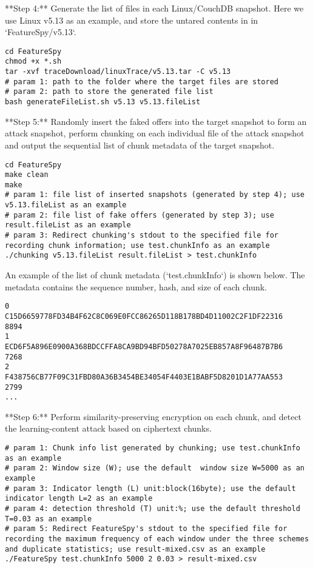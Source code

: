 **Step 4:** Generate the list of files in each Linux/CouchDB snapshot. Here we use Linux v5.13 as an example, and store the untared contents in in `FeatureSpy/v5.13`.

\begin{lstlisting}[style=shell]
cd FeatureSpy
chmod +x *.sh
tar -xvf traceDownload/linuxTrace/v5.13.tar -C v5.13
# param 1: path to the folder where the target files are stored
# param 2: path to store the generated file list
bash generateFileList.sh v5.13 v5.13.fileList
\end{lstlisting}

**Step 5:** Randomly insert the faked offers into the target snapshot to form an attack snapshot, perform chunking on each individual file of the attack snapshot and output the sequential list of chunk metadata of the target snapshot.

\begin{lstlisting}[style=shell]
cd FeatureSpy
make clean
make
# param 1: file list of inserted snapshots (generated by step 4); use v5.13.fileList as an example
# param 2: file list of fake offers (generated by step 3); use result.fileList as an example
# param 3: Redirect chunking's stdout to the specified file for recording chunk information; use test.chunkInfo as an example
./chunking v5.13.fileList result.fileList > test.chunkInfo
\end{lstlisting}

An example of the list of chunk metadata (`test.chunkInfo`) is shown below. The metadata contains the sequence number, hash, and size of each chunk.

\begin{lstlisting}[style=c++]
0
C15D6659778FD34B4F62C8C069E0FCC86265D118B178BD4D11002C2F1DF22316
8894
1
ECD6F5A896E0900A368BDCCFFA8CA9BD94BFD50278A7025EB857A8F96487B7B6
7268
2
F438756CB77F09C31FBD80A36B3454BE34054F4403E1BABF5D8201D1A77AA553
2799
...
\end{lstlisting}

**Step 6:** Perform similarity-preserving encryption on each chunk, and detect the learning-content attack based on ciphertext chunks.

\begin{lstlisting}[style=shell]
# param 1: Chunk info list generated by chunking; use test.chunkInfo as an example
# param 2: Window size (W); use the default  window size W=5000 as an example
# param 3: Indicator length (L) unit:block(16byte); use the default indicator length L=2 as an example
# param 4: detection threshold (T) unit:%; use the default threshold T=0.03 as an example
# param 5: Redirect FeatureSpy's stdout to the specified file for recording the maximum frequency of each window under the three schemes and duplicate statistics; use result-mixed.csv as an example
./FeatureSpy test.chunkInfo 5000 2 0.03 > result-mixed.csv
\end{lstlisting}

